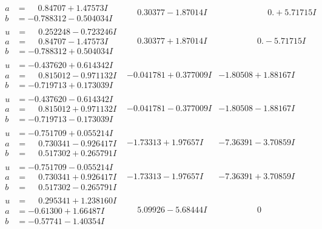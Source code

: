 \documentclass[1p]{elsarticle_modified}
\theoremstyle{definition}
\begin{document}
$$\begin{array}{c|c|c}
\begin{aligned}
a &= \phantom{-}0.84707 + 1.47573 I \\
b &= -0.788312 - 0.504034 I\end{aligned}
 & \phantom{-}0.30377 - 1.87014 I & \phantom{-0.000000 -}0. + 5.71715 I \\ \hline\begin{aligned}
u &= \phantom{-}0.252248 - 0.723246 I \\
a &= \phantom{-}0.84707 - 1.47573 I \\
b &= -0.788312 + 0.504034 I\end{aligned}
 & \phantom{-}0.30377 + 1.87014 I & \phantom{-0.000000 } 0. - 5.71715 I \\ \hline\begin{aligned}
u &= -0.437620 + 0.614342 I \\
a &= \phantom{-}0.815012 - 0.971132 I \\
b &= -0.719713 + 0.173039 I\end{aligned}
 & -0.041781 + 0.377009 I & -1.80508 + 1.88167 I \\ \hline\begin{aligned}
u &= -0.437620 - 0.614342 I \\
a &= \phantom{-}0.815012 + 0.971132 I \\
b &= -0.719713 - 0.173039 I\end{aligned}
 & -0.041781 - 0.377009 I & -1.80508 - 1.88167 I \\ \hline\begin{aligned}
u &= -0.751709 + 0.055214 I \\
a &= \phantom{-}0.730341 - 0.926417 I \\
b &= \phantom{-}0.517302 + 0.265791 I\end{aligned}
 & -1.73313 + 1.97657 I & -7.36391 - 3.70859 I \\ \hline\begin{aligned}
u &= -0.751709 - 0.055214 I \\
a &= \phantom{-}0.730341 + 0.926417 I \\
b &= \phantom{-}0.517302 - 0.265791 I\end{aligned}
 & -1.73313 - 1.97657 I & -7.36391 + 3.70859 I \\ \hline\begin{aligned}
u &= \phantom{-}0.295341 + 1.238160 I \\
a &= -0.61300 + 1.66487 I \\
b &= -0.57741 - 1.40354 I\end{aligned}
 & \phantom{-}5.09926 - 5.68444 I & \phantom{-0.000000 } 0 \\ \hline\begin{aligned}

\end{aligned}
\end{array}$$
\end{document}
